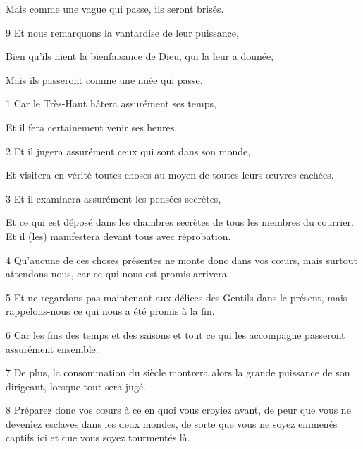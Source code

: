 \par Mais comme une vague qui passe, ils seront brisés.

\par 9 Et nous remarquons la vantardise de leur puissance,

\par Bien qu'ils nient la bienfaisance de Dieu, qui la leur a donnée,

\par Mais ils passeront comme une nuée qui passe.


\par 1 Car le Très-Haut hâtera assurément ses temps,

\par Et il fera certainement venir ses heures.

\par 2 Et il jugera assurément ceux qui sont dans son monde,

\par Et visitera en vérité toutes choses au moyen de toutes leurs œuvres cachées.

\par 3 Et il examinera assurément les pensées secrètes,

\par Et ce qui est déposé dans les chambres secrètes de tous les membres du courrier. Et il (les) manifestera devant tous avec réprobation.

\par 4 Qu'aucune de ces choses présentes ne monte donc dans vos cœurs, mais surtout attendons-nous, car ce qui nous est promis arrivera.

\par 5 Et ne regardons pas maintenant aux délices des Gentils dans le présent, mais rappelons-nous ce qui nous a été promis à la fin.

\par 6 Car les fins des temps et des saisons et tout ce qui les accompagne passeront assurément ensemble.

\par 7 De plus, la consommation du siècle montrera alors la grande puissance de son dirigeant, lorsque tout sera jugé.

\par 8 Préparez donc vos cœurs à ce en quoi vous croyiez avant, de peur que vous ne deveniez esclaves dans les deux mondes, de sorte que vous ne soyez emmenés captifs ici et que vous soyez tourmentés là.

